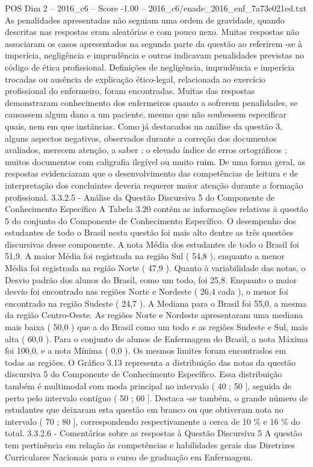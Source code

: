 \begin{textsample}{POS Dim 2 – 2016\_c6 – Score -1.00 – 2016\_c6/enade\_2016\_enf\_7a73e021ed.txt}
As penalidades apresentadas não seguiam uma ordem de gravidade, quando descritas nas respostas eram aleatórias e com pouco nexo.
Muitas respostas não associaram os casos apresentados na segunda parte da questão ao referirem -se à imperícia, negligência e imprudência e outras indicavam penalidades previstas no código de ética profissional.
Definições de negligência, imprudência e imperícia trocadas ou ausência de explicação ético-legal, relacionada ao exercício profissional do enfermeiro, foram encontradas.
Muitas das respostas demonstraram conhecimento dos enfermeiros quanto a sofrerem penalidades, se causassem algum dano a um paciente, mesmo que não soubessem especificar quais, nem em que instâncias.
Como já destacados na análise da questão 3, alguns aspectos negativos, observados durante a correção dos documentos avaliados, merecem atenção, a saber : o elevado índice de erros ortográficos ; muitos documentos com caligrafia ilegível ou muito ruim.
De uma forma geral, as respostas evidenciaram que o desenvolvimento das competências de leitura e de interpretação dos concluintes deveria requerer maior atenção durante a formação profissional. 3.3.2.5 - Análise da Questão Discursiva 5 do Componente de Conhecimento Específico A Tabela 3.20 contém as informações relativas à questão 5 do conjunto do Componente de Conhecimento Específico.
O desempenho dos estudantes de todo o Brasil nesta questão foi mais alto dentre as três questões discursivas desse componente.
A nota Média dos estudantes de todo o Brasil foi 51,9.
A maior Média foi registrada na região Sul ( 54,8 ), enquanto a menor Média foi registrada na região Norte ( 47,9 ).
Quanto à variabilidade das notas, o Desvio padrão dos alunos do Brasil, como um todo, foi 25,8.
Enquanto o maior desvio foi encontrado nas regiões Norte e Nordeste ( 26,4 cada ), o menor foi encontrado na região Sudeste ( 24,7 ).
A Mediana para o Brasil foi 55,0, a mesma da região Centro-Oeste.
As regiões Norte e Nordeste apresentaram uma mediana mais baixa ( 50,0 ) que a do Brasil como um todo e as regiões Sudeste e Sul, mais alta ( 60,0 ).
Para o conjunto de alunos de Enfermagem do Brasil, a nota Máxima foi 100,0, e a nota Mínima ( 0,0 ).
Os mesmos limites foram encontrados em todas as regiões.
O Gráfico 3.13 representa a distribuição das notas da questão discursiva 5 do Componente de Conhecimento Específico.
Essa distribuição também é multimodal com moda principal no intervalo ( 40 ; 50 ], seguida de perto pelo intervalo contíguo ( 50 ; 60 ].
Destaca -se também, o grande número de estudantes que deixaram esta questão em branco ou que obtiveram nota no intervalo ( 70 ; 80 ], correspondendo respectivamente a cerca de 10 \% e 16 \% do total. 3.3.2.6 - Comentários sobre as respostas à Questão Discursiva 5 A questão tem pertinência em relação às competências e habilidades gerais das Diretrizes Curriculares Nacionais para o curso de graduação em Enfermagem.

\end{textsample}
